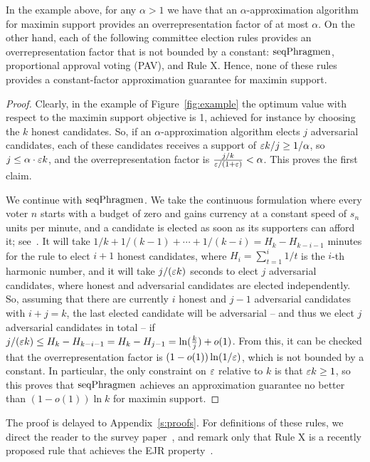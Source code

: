 \begin{lemma}
In the example above, for any $\alpha>1$ we have that an $\alpha$-approximation algorithm for maximin support provides an overrepresentation factor of at most $\alpha$.
On the other hand, each of the following committee election rules provides an overrepresentation factor that is not bounded by a constant: $\operatorname{seqPhragmen}$, proportional approval voting (PAV), and Rule X. Hence, none of these rules provides a constant-factor approximation guarantee for maximin support. 
\end{lemma}

\begin{proof}
Clearly, in the example of Figure~\ref{fig:example} the optimum value with respect to the maximin support objective is 1, achieved for instance by choosing the $k$ honest candidates. 
So, if an $\alpha$-approximation algorithm elects $j$ adversarial candidates, each of these candidates receives a support of $\varepsilon k/j \geq 1/\alpha$, so $j\leq \alpha \cdot \varepsilon k$, and the overrepresentation factor is $\frac{j/k}{\varepsilon/(1+\varepsilon)}< \alpha$. This proves the first claim.

We continue with $\operatorname{seqPhragmen}$. We take the continuous formulation where every voter $n$ starts with a budget of zero and gains currency at a constant speed of $s_n$ units per minute, and a candidate is elected as soon as its supporters can afford it; see~\cite{lackner2020approval}.  
It will take $1/k+1/(k-1)+\cdots + 1/(k-i)= H_k - H_{k-i-1}$ minutes for the rule to elect $i+1$ honest candidates, where $H_i=\sum_{t=1}^i 1/t$ is the $i$-th harmonic number, and it will take $j/(\varepsilon k)$ seconds to elect $j$ adversarial candidates, where honest and adversarial candidates are elected independently. 
So, assuming that there are currently $i$ honest and $j-1$ adversarial candidates with $i+j=k$, the last elected candidate will be adversarial -- and thus we elect $j$ adversarial candidates in total -- if $j/(\varepsilon k)\leq H_k - H_{k-i-1} = H_k - H_{j-1}=\ln(\frac{k}{j}) +o(1)$.
From this, it can be checked that the overrepresentation factor is  $(1-o(1)) \ln (1/\varepsilon)$, which is not bounded by a constant. 
In particular, the only constraint on $\varepsilon$ relative to $k$ is that $\varepsilon k\geq 1$, so this proves that $\operatorname{seqPhragmen}$ achieves an approximation guarantee no better than $(1-o(1)) \ln k$ for maximin support.
\end{proof}

The proof is delayed to Appendix~\ref{s:proofs}. For definitions of these rules, we direct the reader to the survey paper~\cite{lackner2020approval}, and remark only that Rule X is a recently proposed rule that achieves the EJR property~\cite{peters2019proportionality}. 

